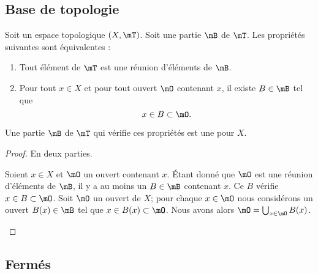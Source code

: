 \subsection{Base de topologie}

\begin{propositionDef}  \label{DEFooLEHPooIlNmpi}
	Soit un espace topologique \( (X,\mT)\). Soit une partie \( \mB\) de \( \mT\). Les propriétés suivantes sont équivalentes :
	\begin{enumerate}
		\item\label{ITEMooCTPEooRCaxvx}
		      Tout élément de \( \mT\) est une réunion d'éléments de \( \mB\).
		\item       \label{ITEMooWOVWooRozYmM}
		      Pour tout \( x\in X\) et pour tout ouvert \( \mO\) contenant \( x\), il existe \( B\in \mB\) tel que
		      \begin{equation}
			      x\in B\subset \mO.
		      \end{equation}
	\end{enumerate}
	Une partie \( \mB\) de \( \mT\) qui vérifie ces propriétés est une  pour \( X\).
\end{propositionDef}

\begin{proof}
	En deux parties.
	\begin{subproof}
		Soient \( x\in X\) et \( \mO\) un ouvert contenant \( x\). Étant donné que \( \mO\) est une réunion d'éléments de \( \mB\), il y a au moins un \( B\in \mB\) contenant \( x\). Ce \( B\) vérifie \( x\in B\subset \mO\).
		Soit \( \mO\) un ouvert de \( X\); pour chaque \( x\in\mO\) nous considérons un ouvert \( B(x)\in \mB\) tel que \( x\in B(x)\subset\mO\). Nous avons alors \( \mO=\bigcup_{x\in \mO}B(x)\).
	\end{subproof}
\end{proof}

\subsection{Fermés}

